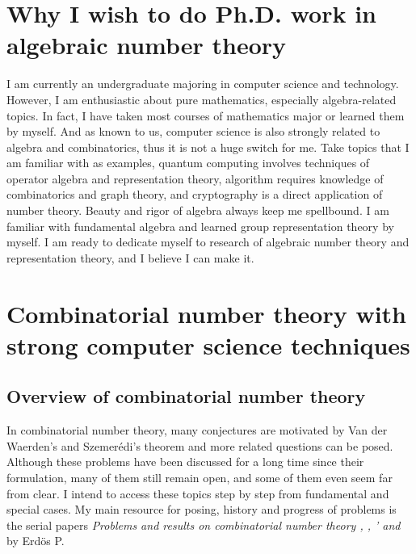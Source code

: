 \documentclass[12pt]{article}
\begin{document}
\section{Why I wish to do Ph.D. work in algebraic number theory}
I am currently an undergraduate majoring in computer science and technology. However, I am enthusiastic about pure mathematics, especially algebra-related topics. In fact, I have taken most courses of mathematics major or learned them by myself. And as known to us, computer science is also strongly related to algebra and combinatorics, thus it is not a huge switch for me. Take topics that I am familiar with as examples, quantum computing involves techniques of operator algebra and representation theory, algorithm requires knowledge of combinatorics and graph theory, and cryptography is a direct application of number theory. Beauty and rigor of algebra always keep me spellbound. I am familiar with fundamental algebra and learned group representation theory by myself. I am ready to dedicate myself to research of algebraic number theory and representation theory, and I believe I can make it.

\bigskip 

\section{Combinatorial number theory with strong computer science techniques}
\subsection{Overview of combinatorial number theory}


In combinatorial number theory, many conjectures are motivated by Van der Waerden's and Szemer\'{e}di's theorem and more related questions can be posed. Although these problems have been discussed for a long time since their formulation, many of them still remain open, and some of them even seem far from clear. I intend to access these topics step by step from fundamental and special cases. My main resource for posing, history and progress of problems is the serial papers \textit{Problems and results on combinatorial number theory \uppercase\expandafter{}\cite{erdos1}, \uppercase\expandafter{}\cite{erdos2}, \uppercase\expandafter{}'\cite{erdos2_} and \uppercase\expandafter{}\cite{erdos3}} by Erd\"{o}s P.
\end{document}

